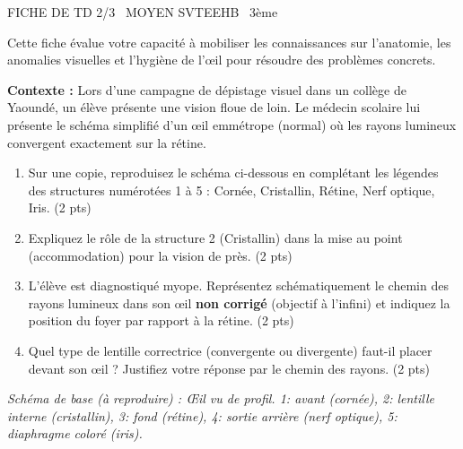 \documentclass[11pt]{article}
\begin{document}
\begin{tcolorbox}[enhanced,colback=popink,colframe=popink,arc=10pt,boxrule=0pt,left=12pt,right=12pt,top=9pt,bottom=9pt]
{\color{white}\popxbold\small FICHE DE TD 2/3 \textbullet\ MOYEN \hfill SVTEEHB \textbullet\ 3ème\par}
\end{tcolorbox}
\vspace{4pt}
Cette fiche évalue votre capacité à mobiliser les connaissances sur l'anatomie, les anomalies visuelles et l'hygiène de l'œil pour résoudre des problèmes concrets.

\begin{exercice}
    \textbf{Contexte :} Lors d'une campagne de dépistage visuel dans un collège de Yaoundé, un élève présente une vision floue de loin. Le médecin scolaire lui présente le schéma simplifié d'un œil emmétrope (normal) où les rayons lumineux convergent exactement sur la rétine.
    \begin{enumerate}
        \item Sur une copie, reproduisez le schéma ci-dessous en complétant les légendes des structures numérotées 1 à 5 : Cornée, Cristallin, Rétine, Nerf optique, Iris. (2 pts)
        \item Expliquez le rôle de la structure 2 (Cristallin) dans la mise au point (accommodation) pour la vision de près. (2 pts)
        \item L'élève est diagnostiqué myope. Représentez schématiquement le chemin des rayons lumineux dans son œil \textbf{non corrigé} (objectif à l'infini) et indiquez la position du foyer par rapport à la rétine. (2 pts)
        \item Quel type de lentille correctrice (convergente ou divergente) faut-il placer devant son œil ? Justifiez votre réponse par le chemin des rayons. (2 pts)
    \end{enumerate}
    \textit{Schéma de base (à reproduire) : Œil vu de profil. 1: avant (cornée), 2: lentille interne (cristallin), 3: fond (rétine), 4: sortie arrière (nerf optique), 5: diaphragme coloré (iris).}
\end{exercice}
\end{document}
